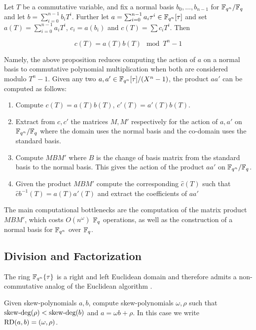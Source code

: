 \begin{proposition*}{\cite[Prop. 1.6]{CaLe17}}
Let $T$ be a commutative variable, and fix a normal basis $b_0, \ldots, b_{n-1}$ for $\mathbb{F}_{q^n}/\mathbb{F}_q$ and let $b = \sum_{i=0}^{n-1} b_i T^i$. Further let $a = \sum_{i=0}^{n-1} a_i \tau^i\in \mathbb{F}_{q^n}[\tau]$ and set $a(T) = \sum_{i=0}^{n-1} a_i T^i$, $c_i = a(b_i)$ and $c(T) = \sum c_iT^i$. Then

\begin{equation*}
    c(T) = a(T)b(T) \mod T^n -1
\end{equation*}

\end{proposition*}

Namely, the above proposition reduces computing the action of $a$ on a normal basis to commutative polynomial multiplication when both are considered modulo $T^n - 1$. Given any two $a, a' \in \mathbb{F}_{q^n}[\tau]/(X^n - 1)$, the product $aa'$ can be computed as follows:

\begin{enumerate}
    \item Compute $c(T) = a(T) b(T)$, $c'(T) = a'(T)b(T)$.
    \item Extract from $c,c'$ the matrices $M,M'$ respectively for the action of $a, a'$ on $\mathbb{F}_{q^n}/\mathbb{F}_q$ where the domain uses the normal basis and the co-domain uses the standard basis.
    \item Compute $M B M'$ where $B$ is the change of basis matrix from the standard basis to the normal basis. This gives the action of the product $aa'$ on $\mathbb{F}_{q^n}/\mathbb{F}_q$.
    \item Given the product $MBM'$ compute the corresponding $\hat{c}(T)$ such that $\hat{c}b^{-1}(T) = a(T)a'(T)$ and extract the coefficients of $aa'$
\end{enumerate}

The main computational bottlenecks are the computation of the matrix product $MBM'$, which costs $O(n^{\omega})$ $\mathbb{F}_q$ operations, as well as the construction of a normal basis for $\mathbb{F}_{q^n}$ over $\mathbb{F}_q$. 

\subsection{Division and Factorization}

The ring $\mathbb{F}_{q^n}\{\tau\}$ is a right and left Euclidean domain and therefore admits a non-commutative analog of the Euclidean algorithm \cite{ore}. 

\begin{problem}
Given skew-polynomials $a, b$, compute skew-polynomials $\omega, \rho$ such that $\textnormal{skew-deg}(\rho) < \textnormal{skew-deg}(b)$ and $a = \omega b + \rho$. In this case we write $\textnormal{RD}(a, b) = (\omega, \rho)$. 
\end{problem}

